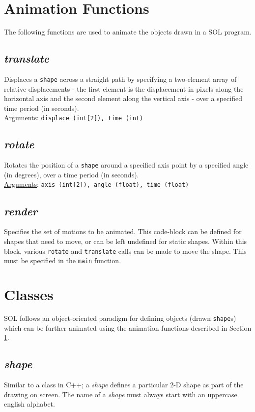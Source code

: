 \section{Animation Functions} \label{animation}
The following functions are used to animate the objects drawn in a SOL program.

    \subsection{\textit{translate}}
    Displaces a \texttt{shape} across a straight path by specifying a two-element array of relative displacements - the first element is the displacement in pixels along the horizontal axis and the second element along the vertical axis - over a specified time period (in seconds).\\
    \underline{Arguments}: \texttt{displace (int[2]), time (int)}

    \subsection{\textit{rotate}}
    Rotates the position of a \texttt{shape} around a specified axis point by a specified angle (in degrees), over a time period (in seconds).\\
    \underline{Arguments}: \texttt{axis (int[2]), angle (float), time (float)}

    \subsection{\textit{render}}
    Specifies the set of motions to be animated. This code-block can be defined for shapes that need to move, or can be left undefined for static shapes. Within this block, various \texttt{rotate} and \texttt{translate} calls can be made to move the shape. This must be specified in the \texttt{main} function.\\

\section{Classes} \label{classes}
SOL follows an object-oriented paradigm for defining objects (drawn \texttt{shape}s) which can be further animated using the animation functions described in Section \ref{animation}.

    \subsection{\textit{shape}}
    Similar to a class in C++; a \textit{shape} defines a particular 2-D shape as part of the drawing on screen. The name of a \textit{shape} must always start with an uppercase english alphabet.


